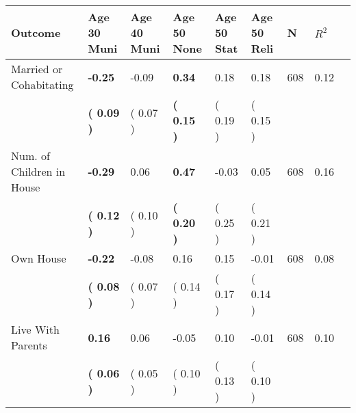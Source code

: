 \begin{tabular}{L{6.2cm} C{1.8cm} C{1.8cm} C{1.8cm} C{1.8cm} C{1.8cm} C{1.8cm} C{0.3cm} C{0.3cm}}
\toprule
 \textbf{Outcome} & \textbf{Age 30 Muni} & \textbf{Age 40 Muni} & \textbf{Age 50 None} & \textbf{Age 50 Stat} & \textbf{Age 50 Reli} & \textbf{N} & \textbf{$ R^2$} \\
\midrule
Married or Cohabitating & \textbf{    -0.25} &     -0.09 & \textbf{     0.34} &      0.18 &      0.18  & 608 &       0.12 \\ 
 & \textbf{(     0.09 )} & (     0.07 ) & \textbf{(     0.15 )} & (     0.19 ) & (     0.15 )  & \\
Num. of Children in House & \textbf{    -0.29} &      0.06 & \textbf{     0.47} &     -0.03 &      0.05  & 608 &       0.16 \\ 
 & \textbf{(     0.12 )} & (     0.10 ) & \textbf{(     0.20 )} & (     0.25 ) & (     0.21 )  & \\
Own House & \textbf{    -0.22} &     -0.08 &      0.16 &      0.15 &     -0.01  & 608 &       0.08 \\ 
 & \textbf{(     0.08 )} & (     0.07 ) & (     0.14 ) & (     0.17 ) & (     0.14 )  & \\
Live With Parents & \textbf{     0.16} &      0.06 &     -0.05 &      0.10 &     -0.01  & 608 &       0.10 \\ 
 & \textbf{(     0.06 )} & (     0.05 ) & (     0.10 ) & (     0.13 ) & (     0.10 )  & \\
\bottomrule
\end{tabular}
